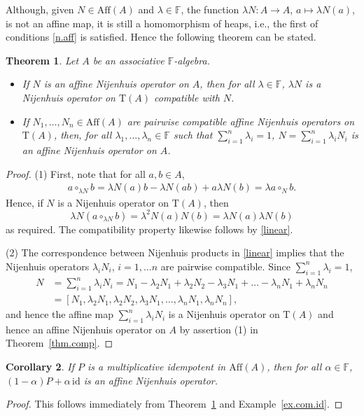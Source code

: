 \documentclass[10pt,a4paper]{amsart}
\numberwithin{equation}{section}
\newtheorem{Theorem}{Theorem}[section]
\newtheorem{Corollary}[Theorem]{Corollary}
\newcommand{\F}{\mathbb F}
\newcommand{\id}{\mathrm{id}}
\begin{document}
Although, given $N\in \mathrm{Aff}(A)$ and $\lambda \in \F$, the function $\lambda N\colon A\to A$, $a\mapsto \lambda N(a)$, is not an affine map, it is still a homomorphism of heaps, i.e., the first of conditions \eqref{n.aff} is satisfied. Hence the following theorem can be stated.

\begin{Theorem}\label{thm.affine}
Let $A$ be an associative $\F$-algebra.
\begin{itemize}
 \item[$(1)$] If $N$ is an affine Nijenhuis operator on $A$, then for all $\lambda \in \F$, $\lambda N$ is a Nijenhuis operator on $\mathrm{T}(A)$ compatible with $N$.
\item[$(2)$] If $N_1,\dots , N_n\in \mathrm{Aff}(A)$ are pairwise compatible affine Nijenhuis operators on $\mathrm{T}(A)$, then, for all $\lambda_1,\dots, \lambda_n\in \F$ such that $\sum_{i=1}^n\lambda_i =1$,
 $N = \sum_{i=1}^n \lambda_i N_i $
 is an affine Nijenhuis operator on $A$.
\end{itemize}
\end{Theorem}
\begin{proof}
 (1) First, note that for all $a,b\in A$,
 \begin{align}\label{linear}
 a\circ_{\lambda N}b = \lambda N(a)b - \lambda N(ab) + a\lambda N(b) = \lambda a\circ _N b.
 \end{align}
 Hence, if $N$ is a Nijenhuis operator on $\mathrm{T}(A)$, then
 \[
 \lambda N(a\circ_{\lambda N}b) = \lambda^2 N(a)N(b) = \lambda N(a)\lambda N(b)
 \]
 as required.
The compatibility property likewise follows by \eqref{linear}.

(2) The correspondence between Nijenhuis products in \eqref{linear} implies that the Nijenhuis operators $\lambda_iN_i$, $i=1,\dots n$ are pairwise compatible. Since $\sum_{i=1}^n\lambda_i =1$,
\begin{align*}
 N &= \sum_{i=1}^n \lambda_i N_i = N_1 - \lambda_2 N_1 + \lambda_2 N_2 - \lambda_3 N_1 + \dots - \lambda_{n} N_1 + \lambda_{n}N_{n}\\
 &= [N_1 ,\lambda_2 N_1 , \lambda_2 N_2 , \lambda_3 N_1 , \dots , \lambda_{n} N_1 , \lambda_{n}N_{n}],
\end{align*}
and hence the affine map $\sum_{i=1}^n \lambda_i N_i$ is a Nijenhuis operator on $\mathrm{T}(A)$ and hence an affine Nijenhuis operator on $A$ by assertion (1) in Theorem~\ref{thm.comp}.
\end{proof}

\begin{Corollary}\label{cor.aff.nij.op}
 If $P$ is a multiplicative idempotent in $\mathrm{Aff}(A)$, then for all $\alpha\in \F$, $(1-\alpha)P + \alpha\, \id$ is an affine Nijenhuis operator.
\end{Corollary}
\begin{proof}
 This follows immediately from Theorem~\ref{thm.affine} and Example~\ref{ex.com.id}.
\end{proof}
\end{document}

